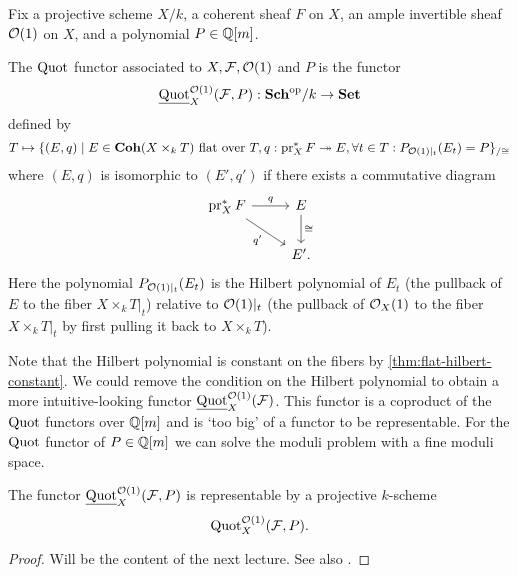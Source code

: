 Fix a projective scheme $X/k$, a coherent sheaf $F$ on $X$, an ample invertible sheaf $\mathcal{O}(1)$ on $X$, and a polynomial $P \in \mathbb{Q}[m]$. 
\begin{definition}
	The $\operatorname{Quot}$ functor associated to $X, \mathcal{F}, \mathcal{O}(1)$ and $P$ is the functor \[\underline{\operatorname{Quot}}_X^{\mathcal{O}(1)}(\mathcal{F}, P): \mathbf{Sch}^{\operatorname{op}}/k \to \mathbf{Set}\] defined by \[
  	T \mapsto \{(E,q) \mid E \in \mathbf{Coh}(X \times_k T) \text{ flat over } T
	 ,  q: \operatorname{pr}_X^*F \twoheadrightarrow E, \forall t\in T: P_{\mathcal{O}(1)|_t}(E_t) = P\}_{/\cong}
  \] where $(E, q)$ is isomorphic to $(E', q')$ if there exists a commutative diagram 
\[\begin{tikzcd}
	{\operatorname{pr}_X^*F} & E \\
	& {E'}.
	\arrow["q", from=1-1, to=1-2]
	\arrow["{q'}"', from=1-1, to=2-2]
	\arrow["\cong", from=1-2, to=2-2]
\end{tikzcd}\] Here the polynomial $P_{\mathcal{O}(1)|_t}(E_t)$ is the Hilbert polynomial of $E_t$ (the pullback of $E$ to the fiber $X \times_k T|_t$) relative to $\mathcal{O}(1)|_t$ (the pullback of $\mathcal{O}_X(1)$ to the fiber $X \times_k T|_t$ by first pulling it back to $X\times_k T$).
\end{definition}
Note that the Hilbert polynomial is constant on the fibers by \cref{thm:flat-hilbert-constant}.
We could remove the condition on the Hilbert polynomial to obtain a more intuitive-looking functor $\underline{\operatorname{Quot}}_X^{\mathcal{O}(1)}(\mathcal{F})$. This functor is a coproduct of the $\operatorname{Quot}$ functors over $\mathbb{Q}[m]$ and is `too big' of a functor to be representable. For the $\operatorname{Quot}$ functor of $P \in \mathbb{Q}[m]$ we can solve the moduli problem with a fine moduli space. 

\begin{theorem}[Grothendieck]
	The functor $\underline{\operatorname{Quot}}_X^{\mathcal{O}(1)}(\mathcal{F}, P)$ is representable by a projective $k$-scheme \[\operatorname{Quot}_X^{\mathcal{O}(1)}(\mathcal{F}, P).\]
\end{theorem}
\begin{proof}
	Will be the content of the next lecture. See also \cite[Theorem~8.43]{m15}. 
\end{proof}
